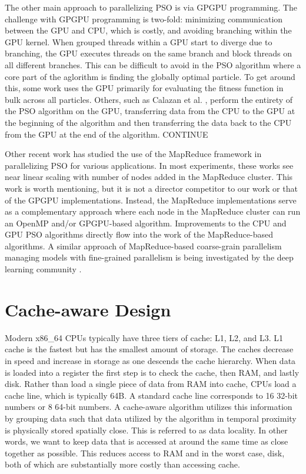 The other main approach to parallelizing PSO is via GPGPU programming. The
challenge with GPGPU programming is two-fold: minimizing communication between
the GPU and CPU, which is costly, and avoiding branching within the GPU
kernel. When grouped threads within a GPU start to diverge due to branching, the
GPU executes threads on the same branch and block threads on all different
branches. This can be difficult to avoid in the PSO algorithm where a core part
of the aglorithm is finding the globally optimal particle. To get around this,
some work \cite{gpu-ppso, gpu-pso} uses the GPU primarily for evaluating the
fitness function in bulk across all particles.
Others, such as Calazan et al. \cite{swarmgrid}, perform the entirety of
the PSO algorithm on the GPU, transferring data from the CPU to the GPU at the
beginning of the algorithm and then transferring the data back to the CPU from
the GPU at the end of the algorithm.
CONTINUE \cite{biopsogpu, multiswarmpso-gpu}

Other recent work \cite{mrcpso, mprso, coop-pso, intrusion-pso} has
studied the use of the MapReduce framework \cite{mapreduce} in parallelizing PSO
for various applications. In most experiments, these works see near linear
scaling with number of nodes added in the MapReduce cluster. This work is worth
mentioning, but it is not a director competitor to our work or that of the GPGPU
implementations. Instead, the MapReduce implementations serve as a complementary
approach where each node in the MapReduce cluster can run an OpenMP and/or
GPGPU-based algorithm. Improvements to the CPU and GPU PSO algorithms directly
flow into the work of the MapReduce-based algorithms. A similar approach of
MapReduce-based coarse-grain parallelism managing models with fine-grained
parallelism is being investigated by the deep learning community \cite{mrpnn,
  heterospark, dlspark}. 

\section{Cache-aware Design}\label{sec:cache}
Modern x86\_64 CPUs typically have three tiers of cache: L1, L2, and
L3. L1 cache is the fastest but has the smallest amount of storage. The caches
decrease in speed and increase in storage as one descends the cache
hierarchy. When data is loaded into a register the first step is to check the
cache, then RAM, and lastly disk. Rather than load a single piece of data from
RAM into cache, CPUs load a cache line, which is typically 64B. A standard cache
line corresponds to 16 32-bit numbers or 8 64-bit numbers. A cache-aware
algorithm utilizes this information by grouping data such that data utilized by
the algorithm in temporal proximity is physically stored spatially close. This
is referred to as data locality. In other words, we want to keep data that is
accessed at around the same time as close together as possible. This reduces
access to RAM and in the worst case, disk, both of which are substantially more
costly than accessing cache.

